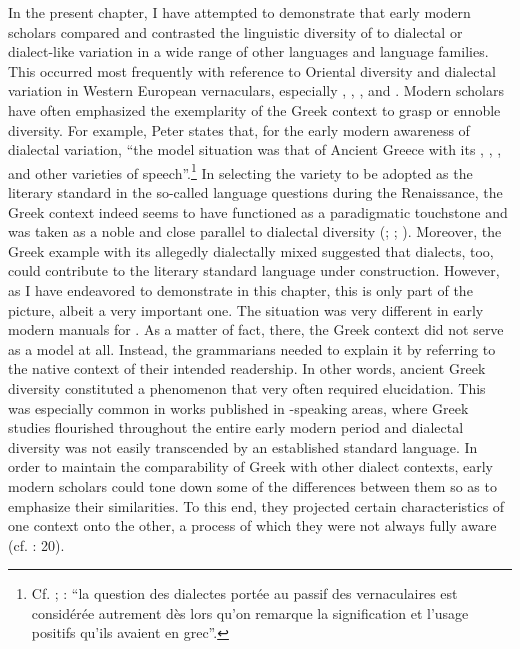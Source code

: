 In the present chapter, I have attempted to demonstrate that early modern scholars compared and contrasted the linguistic diversity of  to dialectal or dialect-like variation in a wide range of other languages and language families. This occurred most frequently with reference to Oriental diversity and dialectal variation in Western European vernaculars, especially , , , and . Modern scholars have often emphasized the exemplarity of the Greek context to grasp or ennoble  diversity. For example, Peter \citet[35--36]{Burke2004} states that, for the early modern awareness of dialectal variation, “the model situation was that of Ancient Greece with its , , , and other varieties of speech”.\footnote{Cf. \citet[923]{Haugen1966}; \citet[216]{Giard1992}: “la question des dialectes portée au passif des vernaculaires est considérée autrement dès lors qu’on remarque la signification et l’usage positifs qu’ils avaient en grec”.} In selecting the variety to be adopted as the literary standard in the so-called language questions during the Renaissance, the Greek context indeed seems to have functioned as a paradigmatic touchstone and was taken as a noble and close parallel to  dialectal diversity (\citealt{Alinei1984}; \citealt{Trovato1984}; \citealt{Trapp1990}). Moreover, the Greek example with its allegedly dialectally mixed  suggested that  dialects, too, could contribute to the literary standard language under construction. However, as I have endeavored to demonstrate in this chapter, this is only part of the picture, albeit a very important one. The situation was very different in early modern manuals for . As a matter of fact, there, the Greek context did not serve as a model at all. Instead, the grammarians needed to explain it by referring to the native  context of their intended readership. In other words, ancient Greek diversity constituted a phenomenon that very often required elucidation. This was especially common in works published in -speaking areas, where Greek studies flourished throughout the entire early modern period and  dialectal diversity was not easily transcended by an established standard language. In order to maintain the comparability of Greek with other dialect contexts, early modern scholars could tone down some of the differences between them so as to emphasize their similarities. To this end, they projected certain characteristics of one context onto the other, a process of which they were not always fully aware (cf. \citealt{Alinei1980}: 20).

